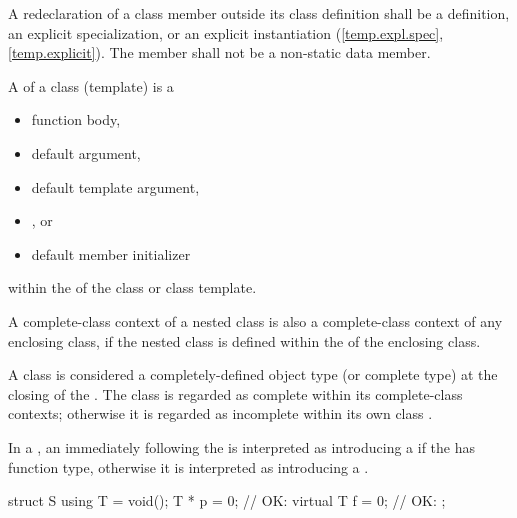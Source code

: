 \pnum
A redeclaration of a class member outside its class definition shall be
a definition,
an explicit specialization, or
an explicit instantiation (\ref{temp.expl.spec}, \ref{temp.explicit}).
The member shall not be a non-static data member.

\pnum
{}%
A  of a class (template) is a
\begin{itemize}
\item function body,
\item default argument,
\item default template argument,
\item {}, or
\item default member initializer
\end{itemize}
within the  of the class or class template.
\begin{note}
A complete-class context of a nested class is also a complete-class
context of any enclosing class, if the nested class is defined within
the  of the enclosing class.
\end{note}

\pnum
A class is considered a completely-defined object
type (or complete type) at the closing \tcode{\}} of
the .
The class is regarded as complete within its complete-class contexts;
otherwise it is regarded as incomplete within its own class
.

\pnum
In a ,
an \tcode{=} immediately following the 
is interpreted as introducing a 
if the  has function type,
otherwise it is interpreted as introducing
a .
\begin{example}
\begin{codeblock}
struct S {
  using T = void();
  T * p = 0;        // OK: 
  virtual T f = 0;  // OK: 
};
\end{codeblock}
\end{example}

